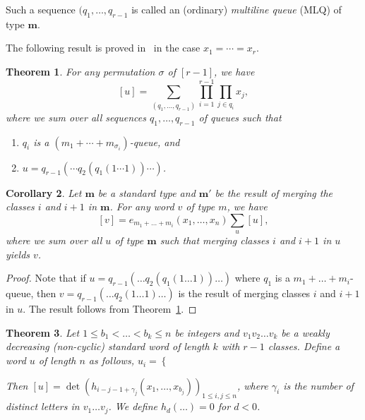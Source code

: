 \documentclass[submission]{FPSAC2018}
\newcommand{\0}{\phantom{c}}
\newcommand{\mm}{\mathbf{m}}
\let\sumnonlimits\sum
\let\prodnonlimits\prod
\renewcommand{\sum}{\sumnonlimits\limits}
\renewcommand{\prod}{\prodnonlimits\limits}
\newcommand{\defn}[1]{{\color{darkred}\emph{#1}}} %
\theoremstyle{plain}
\newtheorem{thm}{Theorem}[section]
\newtheorem{cor}[thm]{Corollary}
\theoremstyle{definition}
\numberwithin{equation}{section}
\newcommand{\erik}[1]{\todo[size=\tiny,color=green!30]{#1 \\ \hfill --- Erik}}
\begin{document}
Such a sequence $(q_1, \dotsc, q_{r-1}$ is called an (ordinary) \defn{multiline queue} (MLQ) of type $\mm$.

The following result is proved in~\cite{AAMP} in the case $x_1 = \cdots = x_r$. \erik{our proof is different[...]}

\begin{thm}
\label{thm:permutation}
  For any permutation $\sigma$ of $[r-1]$, we have 
\[
  [u] = \sum_{(q_1, \dots, q_{r-1})} \prod_{i=1} ^{r-1} \prod_{j\in q_i} x_j,
\]
where we sum over all sequences $q_1, \dotsc, q_{r-1}$ of queues such that
\begin{enumerate}
\item $q_i$ is a $(m_1 + \cdots + m_{\sigma_i})$-queue, and
\item $u = q_{r-1}(\cdots q_2(q_1(1\dotsm 1)) \cdots )$.
\end{enumerate}
\end{thm}

\begin{cor}
  Let $\mm$ be a standard type and $\mm'$ be the result of merging the classes $i$ and $i+1$ in $\mm$. For any word $v$ of type $m$, we have
\[
  [v] = e_{m_1+\dots+m_i}(x_1, \dots, x_n) \sum_u [u],
\]
where we sum over all $u$ of type $\mm$ such that merging classes $i$ and $i+1$ in $u$ yields $v$.
\end{cor}

\begin{proof}
  Note that if $u = q_{r-1}(\dots q_2(q_1(1 \dots 1)) \dots)$ where $q_1$ is a $m_1+\dots+m_i$-queue, then $v = q_{r-1}(\dots q_2(1\dots 1)\dots)$ is the result of merging classes $i$ and $i+1$ in $u$. The result follows from Theorem~\ref{thm:permutation}.
\end{proof}

\begin{thm}
\label{thm:determinant_form}
  Let $1 \leq b_1 < \dots < b_k \leq n$ be integers and $v_1v_2 \dots v_k$ be a weakly decreasing (non-cyclic) standard word of length $k$ with $r-1$ classes. Define a word $u$ of length $n$ as follows,
  $u_i = \left\{
 \right.$

Then $[u] = \det(h_{i-j-1+\gamma_j}(x_1, \dots, x_{b_j}))_{1\leq i,j\leq n}$, where $\gamma_i$ is the number of distinct letters in $v_1\dots v_j$. We define $h_d(\dots) = 0$ for $d < 0$.
\end{thm}
\end{document}
